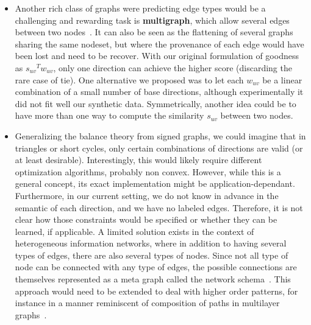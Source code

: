 \begin{itemize}[leftmargin=*]
  \item Another rich class of graphs were predicting edge types would be a challenging and rewarding
    task is \textbf{multigraph}, which allow several edges between two
    nodes~\autocite{typedMultigraph11}. It can also be seen as
    the flattening of several graphs sharing the same nodeset, but where the provenance of each edge
    would have been lost and need to be recover. With our original formulation of goodness as
    ${s_{uv}}^T w_{uv}$, only one direction can achieve the higher score (discarding the rare case
    of tie). One alternative we proposed was to let each $w_{uv}$ be a linear combination of a small
    number of base directions, although experimentally it did not fit well our synthetic data.
    Symmetrically, another idea could be to have more than one way to compute the similarity
    $s_{uv}$ between two nodes.

  \item Generalizing the balance theory from signed graphs, we could imagine that in triangles or
    short cycles, only certain combinations of directions are valid (or at least desirable).
    Interestingly, this would likely require different optimization algorithms, probably non convex.
    However, while this is a general concept, its exact implementation might be
    application-dependant. Furthermore, in our current setting, we do not know in advance in the
    semantic of each direction, and we have no labeled edges. Therefore, it is not clear how those
    constraints would be specified or whether they can be learned, if applicable. A limited solution
    exists in the context of heterogeneous information networks, where in addition to having several
    types of edges, there are also several types of nodes. Since not all type of node can be
    connected with any type of edges, the possible connections are themselves represented as a meta
    graph called the network schema~\autocite[Definition 3]{HINSurvey17}. This approach would need
    to be extended to deal with higher order patterns, for instance in a manner reminiscent of
    composition of paths in multilayer graphs~\autocites{metapath11}[Section
    4.2]{KnowledgeGraphSurvey17}.


\end{itemize}
